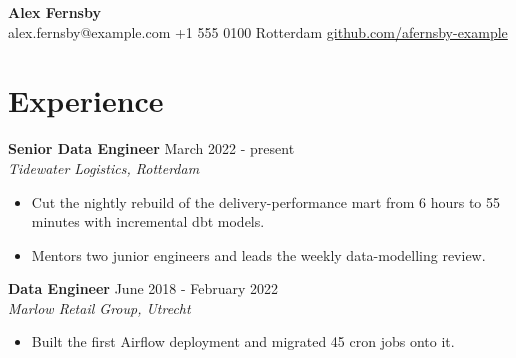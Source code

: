 \documentclass[10pt,a4paper]{article}
\newcommand{\entry}[3]{\textbf{#1} \hfill #3\\ \emph{#2}\vspace{-2pt}}
\begin{document}
{\LARGE\textbf{Alex Fernsby}}\\
alex.fernsby@example.com \quad +1 555 0100 \quad Rotterdam \quad \href{https://github.com/afernsby-example}{github.com/afernsby-example}

\section*{Experience}
\entry{Senior Data Engineer}{Tidewater Logistics, Rotterdam}{March 2022 - present}
\begin{itemize}\setlength\itemsep{0pt}
  \item Cut the nightly rebuild of the delivery-performance mart from 6 hours to 55 minutes with incremental dbt models.
  \item Mentors two junior engineers and leads the weekly data-modelling review.
\end{itemize}
\entry{Data Engineer}{Marlow Retail Group, Utrecht}{June 2018 - February 2022}
\begin{itemize}
  \item Built the first Airflow deployment and migrated 45 cron jobs onto it.
\end{itemize}
\end{document}
